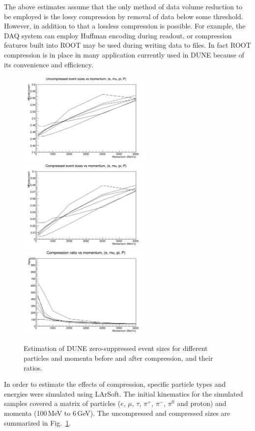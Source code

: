 The above estimates assume that the only method of data volume reduction to be employed is the
lossy compression by removal of data below some threshold.
However, in addition to that
a lossless compression is possible. For example, the DAQ system can employ Huffman encoding
during readout, or compression features built into ROOT may be used during writing data to files.
In fact ROOT compression is in place in many application currently used in DUNE because of its
convenience and efficiency.
\begin{figure}
	\centering
	\includegraphics[width=0.6\textwidth]{btot.png}
	\includegraphics[width=0.6\textwidth]{bzip.png}
	\includegraphics[width=0.6\textwidth]{brat.png}
	\caption{Estimation of DUNE zero-suppressed event sizes for different particles and momenta before and after compression, and their ratios.}
	\label{fig:data-compression}
\end{figure}
In order to estimate the effects of compression, specific particle types and energies were simulated using LArSoft.
The initial kinematics for the simulated samples covered a matrix of
particles ($e$, $\mu$, $\tau$, $\pi^+$, $\pi^-$, $\pi^0$ and proton) and momenta
(100\,MeV to 6\,GeV). The uncompressed and compressed sizes are summarized in Fig.~\ref{fig:data-compression}.

